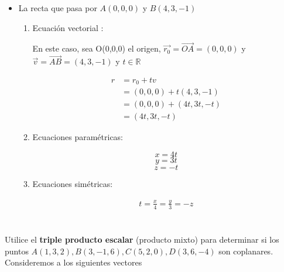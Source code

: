 \documentclass[12pt]{article}
\begin{document}
\begin {itemize}
  
\item La recta que pasa por $A(0,0,0)$ y $B(4,3,-1)$
  
  \begin{enumerate}[format=\textbf]
    
  \item Ecuación vectorial :
    
    En este caso, sea O(0,0,0) el origen,  $\vec{r_0} = \vec{OA} = (0, 0, 0)$  y  $\vec{v} = \vec{AB}= (4,3,-1)$ y $t \in \mathds{R} $
    
    \begin{equation*}
      \begin{split}
        r &= r_0 + tv \\
        &= (0, 0, 0)  + t(4,3,-1) \\
        &= (0, 0, 0)  + (4t,3t,-t)\\
        &= (4t,3t,-t)
      \end{split}
    \end{equation*}
    
  \item Ecuaciones paramétricas:
    
    $$x = 4t $$
    $$y = 3t$$
    $$z =  -t $$
    
  \item Ecuaciones simétricas:
    
    \begin{equation*}
      \begin{split}
        t = \frac{x}{4} = \frac{y}{3} = -z
      \end{split}
    \end{equation*}
    
  \end{enumerate}
  
\end{itemize}

\section{}

Utilice el \textbf{triple producto escalar} (producto mixto) para determinar si los puntos $A(1,3,2) , B(3,-1,6), C(5,2,0), D(3,6,-4)$ son coplanares. \\

Consideremos a los siguientes vectores
\end{document}
